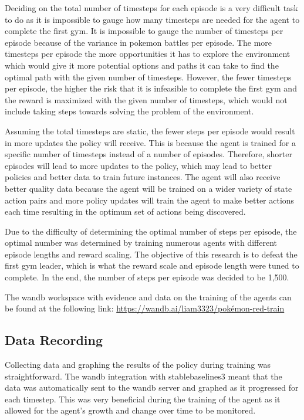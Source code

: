 Deciding on the total number of timesteps for each episode is a very difficult task to do as it is impossible to gauge how many timesteps are needed for the agent to complete the first gym. It is impossible to gauge the number of timesteps per episode because of the variance in pokemon battles per episode. The more timesteps per episode the more opportunities it has to explore the environment which would give it more potential options and paths it can take to find the optimal path with the given number of timesteps. However, the fewer timesteps per episode, the higher the risk that it is infeasible to complete the first gym and the reward is maximized with the given number of timesteps, which would not include taking steps towards solving the problem of the environment. 

Assuming the total timesteps are static, the fewer steps per episode would result in more updates the policy will receive. This is because the agent is trained for a specific number of timesteps instead of a number of episodes. Therefore, shorter episodes will lead to more updates to the policy, which may lead to better policies and better data to train future instances. The agent will also receive better quality data because the agent will be trained on a wider variety of state action pairs and more policy updates will train the agent to make better actions each time resulting in the optimum set of actions being discovered.

Due to the difficulty of determining the optimal number of steps per episode, the optimal number was determined by training numerous agents with different episode lengths and reward scaling. The objective of this research is to defeat the first gym leader, which is what the reward scale and episode length were tuned to complete. In the end, the number of steps per episode was decided to be 1,500. 

The wandb workspace with evidence and data on the training of the agents can be found at the following link: \url{https://wandb.ai/liam3323/pokémon-red-train} \cite{wandb}

\subsection{Data Recording}

Collecting data and graphing the results of the policy during training was straightforward. The wandb integration with stablebaselines3 meant that the data was automatically sent to the wandb server and graphed as it progressed for each timestep. This was very beneficial during the training of the agent as it allowed for the agent's growth and change over time to be monitored.  

